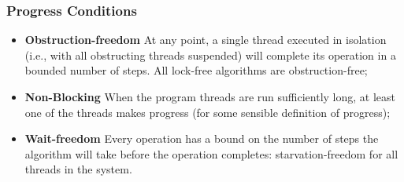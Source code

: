 \subsubsection{Progress Conditions}
\begin{itemize}
    \item \textbf{Obstruction-freedom} At any point, a single thread executed in isolation (i.e., with all obstructing threads suspended) will complete its operation in a bounded number of steps. All lock-free algorithms are obstruction-free;
    \item \textbf{Non-Blocking} When the program threads are run sufficiently long, at least one of the threads makes progress (for some sensible definition of progress);
    \item \textbf{Wait-freedom} Every operation has a bound on the number of steps the algorithm will take before the operation completes: starvation-freedom for all threads in the system.
\end{itemize}
